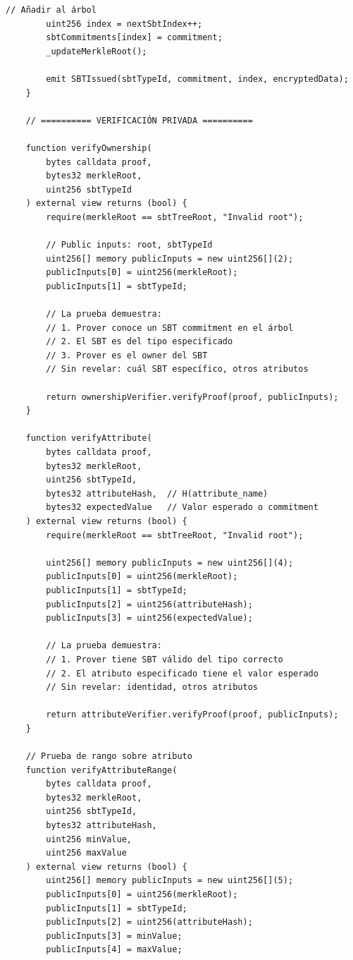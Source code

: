 \documentclass[11pt,a4paper,twoside]{book}
\theoremstyle{definition}
\theoremstyle{remark}
\begin{document}
\begin{lstlisting}[language=Solidity, caption={Private SBT Registry con ZK}]
        // Añadir al árbol
        uint256 index = nextSbtIndex++;
        sbtCommitments[index] = commitment;
        _updateMerkleRoot();
        
        emit SBTIssued(sbtTypeId, commitment, index, encryptedData);
    }
    
    // ========== VERIFICACIÓN PRIVADA ==========
    
    function verifyOwnership(
        bytes calldata proof,
        bytes32 merkleRoot,
        uint256 sbtTypeId
    ) external view returns (bool) {
        require(merkleRoot == sbtTreeRoot, "Invalid root");
        
        // Public inputs: root, sbtTypeId
        uint256[] memory publicInputs = new uint256[](2);
        publicInputs[0] = uint256(merkleRoot);
        publicInputs[1] = sbtTypeId;
        
        // La prueba demuestra:
        // 1. Prover conoce un SBT commitment en el árbol
        // 2. El SBT es del tipo especificado
        // 3. Prover es el owner del SBT
        // Sin revelar: cuál SBT específico, otros atributos
        
        return ownershipVerifier.verifyProof(proof, publicInputs);
    }
    
    function verifyAttribute(
        bytes calldata proof,
        bytes32 merkleRoot,
        uint256 sbtTypeId,
        bytes32 attributeHash,  // H(attribute_name)
        bytes32 expectedValue   // Valor esperado o commitment
    ) external view returns (bool) {
        require(merkleRoot == sbtTreeRoot, "Invalid root");
        
        uint256[] memory publicInputs = new uint256[](4);
        publicInputs[0] = uint256(merkleRoot);
        publicInputs[1] = sbtTypeId;
        publicInputs[2] = uint256(attributeHash);
        publicInputs[3] = uint256(expectedValue);
        
        // La prueba demuestra:
        // 1. Prover tiene SBT válido del tipo correcto
        // 2. El atributo especificado tiene el valor esperado
        // Sin revelar: identidad, otros atributos
        
        return attributeVerifier.verifyProof(proof, publicInputs);
    }
    
    // Prueba de rango sobre atributo
    function verifyAttributeRange(
        bytes calldata proof,
        bytes32 merkleRoot,
        uint256 sbtTypeId,
        bytes32 attributeHash,
        uint256 minValue,
        uint256 maxValue
    ) external view returns (bool) {
        uint256[] memory publicInputs = new uint256[](5);
        publicInputs[0] = uint256(merkleRoot);
        publicInputs[1] = sbtTypeId;
        publicInputs[2] = uint256(attributeHash);
        publicInputs[3] = minValue;
        publicInputs[4] = maxValue;
        

\end{lstlisting}
\end{document}
